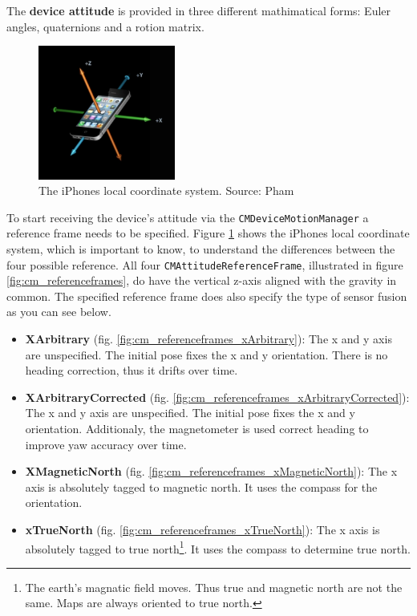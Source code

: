 The \textbf{device attitude} is provided in three different mathimatical forms: Euler angles, quaternions and a rotion matrix.

\begin{center}
  \begin{figure}
    \includegraphics[width=0.4\textwidth]{figures/iphone_coordinatesystem}
    \caption{The iPhones local coordinate system. Source: Pham \cite{wwdc_2012}}
    \label{fig:iphone_cs}
  \end{figure}
\end{center}

To start receiving the device's attitude via the \texttt{CMDeviceMotionManager} a reference frame needs to be specified.
Figure \ref{fig:iphone_cs} shows the iPhones local coordinate system, which is important to know, to understand the differences between the four possible reference.
All four \texttt{CMAttitudeReferenceFrame}, illustrated in figure \ref{fig:cm_referenceframes}, do have the vertical z-axis aligned with the gravity in common.
The specified reference frame does also specify the type of sensor fusion as you can see below.
\begin{itemize}
  \item \textbf{XArbitrary} (fig. \ref{fig:cm_referenceframes_xArbitrary}): The x and y axis are unspecified. The initial pose fixes the x and y orientation. There is no heading correction, thus it drifts over time.
  \item \textbf{XArbitraryCorrected} (fig. \ref{fig:cm_referenceframes_xArbitraryCorrected}): The x and y axis are unspecified. The initial pose fixes the x and y orientation. Additionaly, the magnetometer is used correct heading to improve yaw accuracy over time.
  \item \textbf{XMagneticNorth} (fig. \ref{fig:cm_referenceframes_xMagneticNorth}): The x axis is absolutely tagged to magnetic north. It uses the compass for the orientation.
  \item \textbf{xTrueNorth} (fig. \ref{fig:cm_referenceframes_xTrueNorth}): The x axis is absolutely tagged to true north\footnote{The earth's magnatic field moves. Thus true and magnetic north are not the same. Maps are always oriented to true north.}. It uses the compass to determine true north.
\end{itemize}

